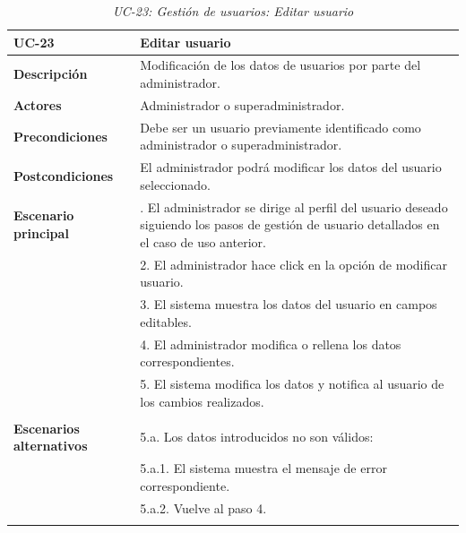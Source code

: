 \begin{table}
  \begin{center}
    \begin{tabularx}{16.4cm}{|l|X|}
      \hline
      \textbf{UC-23} & \textbf{Editar usuario}\\
      \hline
      \textbf{Descripción} & Modificación de los datos de usuarios por parte del administrador.\\
      \hline
      \textbf{Actores} & Administrador o superadministrador.\\
      \hline
      \textbf{Precondiciones} & Debe ser un usuario previamente identificado como administrador o superadministrador.\\
      \hline
      \textbf{Postcondiciones} & El administrador podrá modificar los datos del usuario seleccionado.\\
      \hline
      \textbf{Escenario principal} & \smallskip 1. El administrador se dirige al perfil del usuario deseado siguiendo los pasos de gestión de usuario detallados en el caso de uso anterior.\\
      & 2. El administrador hace click en la opción de modificar usuario. \\
      & 3. El sistema muestra los datos del usuario en campos editables.\\
      & 4. El administrador modifica o rellena los datos correspondientes.\\
      & 5. El sistema modifica los datos y notifica al usuario de los cambios realizados.\\ 
      & \\
      \hline
      \textbf{Escenarios alternativos} & \smallskip 5.a. Los datos introducidos no son válidos:\\
      & \hspace{0.3cm} 5.a.1. El sistema muestra el mensaje de error correspondiente.\\
      & \hspace{0.3cm} 5.a.2. Vuelve al paso 4.\\
      & \\
      \hline
    \end{tabularx}
    \caption{\textit{UC-23: Gestión de usuarios: Editar usuario}}
    \label{tab:CU-editar-usuario-admin}
  \end{center}
\end{table}


